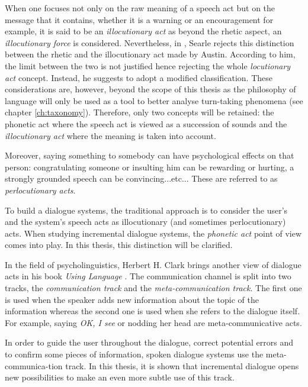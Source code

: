     When one focuses not only on the raw meaning of a speech act but on the message that it contains, whether it is a warning or an encouragement for example, it is said to be an \textit{illocutionary act} as beyond the rhetic aspect, an \textit{illocutionary force} is considered. Nevertheless, in \cite{Searle1968}, Searle rejects this distinction between the rhetic and the illocutionary act made by Austin. According to him, the limit between the two is not justified hence rejecting the whole \textit{locutionary act} concept. Instead, he suggests to adopt a modified classification. These considerations are, however, beyond the scope of this thesis as the philosophy of language will only be used as a tool to better analyse turn-taking phenomena (see chapter \ref{ch:taxonomy}). Therefore, only two concepts will be retained: the phonetic act where the speech act is viewed as a succession of sounds and the \textit{illocutionary act} where the meaning is taken into account.
    
    Moreover, saying something to somebody can have psychological effects on that person: congratulating someone or insulting him can be rewarding or hurting, a strongly grounded speech can be convincing...etc... These are referred to as \textit{perlocutionary acts}.
    
    To build a dialogue systems, the traditional approach is to consider the user's and the system's speech acts as illocutionary (and sometimes perlocutionary) acts. When studying incremental dialogue systems, the \textit{phonetic act} point of view comes into play. In this thesis, this distinction will be clarified.
    
    In the field of psycholinguistics, Herbert H. Clark brings another view of dialogue acts in his book \textit{Using Language} \cite{Clark1996}. The communication channel is split into two tracks, the \textit{communication track} and the \textit{meta-communication track}. The first one is used when the speaker adds new information about the topic of the information whereas the second one is used when she refers to the dialogue itself. For example, saying \textit{OK, I see} or nodding her head are meta-communicative acts. 
        
    In order to guide the user throughout the dialogue, correct potential errors and to confirm some pieces of information, spoken dialogue systems use the meta-communica-tion track. In this thesis, it is shown that incremental dialogue opens new possibilities to make an even more subtle use of this track.
        
